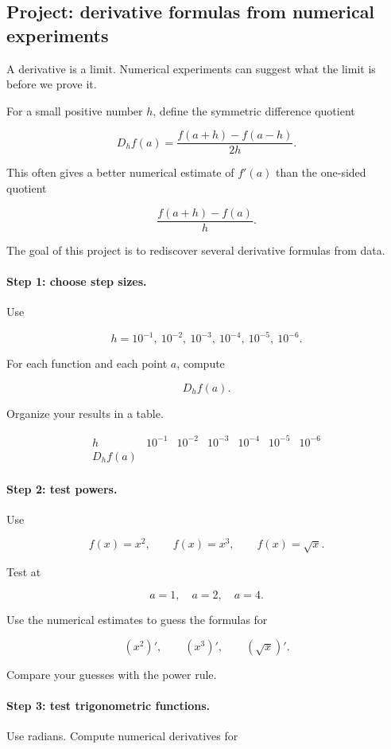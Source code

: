 \subsection{Project: derivative formulas from numerical experiments}
\label{subsec:project-derivative-formulas-numerical-experiments}

A derivative is a limit.  Numerical experiments can suggest what the limit is before we prove it.

For a small positive number \(h\), define the symmetric difference quotient

\[
D_h f(a)=\frac{f(a+h)-f(a-h)}{2h}.
\]

This often gives a better numerical estimate of \(f'(a)\) than the one-sided quotient

\[
\frac{f(a+h)-f(a)}{h}.
\]

The goal of this project is to rediscover several derivative formulas from data.

\paragraph{Step 1: choose step sizes.}
Use

\[
h=10^{-1},\ 10^{-2},\ 10^{-3},\ 10^{-4},\ 10^{-5},\ 10^{-6}.
\]

For each function and each point \(a\), compute

\[
D_h f(a).
\]

Organize your results in a table.

\[
\begin{array}{c|cccccc}
h & 10^{-1} & 10^{-2} & 10^{-3} & 10^{-4} & 10^{-5} & 10^{-6} \\ \hline
D_h f(a) & & & & & &
\end{array}
\]

\paragraph{Step 2: test powers.}
Use

\[
f(x)=x^2,\qquad f(x)=x^3,\qquad f(x)=\sqrt{x}.
\]

Test at

\[
a=1,\quad a=2,\quad a=4.
\]

Use the numerical estimates to guess the formulas for

\[
(x^2)',\qquad
(x^3)',\qquad
(\sqrt{x})'.
\]

Compare your guesses with the power rule.

\paragraph{Step 3: test trigonometric functions.}
Use radians.  Compute numerical derivatives for

